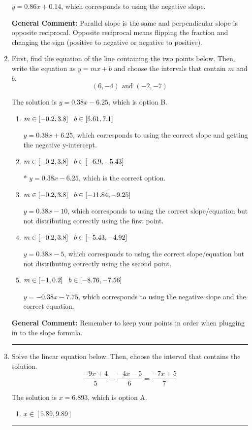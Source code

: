 \documentclass{extbook}[14pt]
\newcommand{\litem}[1]{\item #1

\rule{\textwidth}{0.4pt}}
\begin{document}
\begin{enumerate}
{\begin{enumerate}[label=\Alph*.]
 $y = 0.86x + 0.14$, which corresponds to using the negative slope.
\end{enumerate}

\textbf{General Comment:} Parallel slope is the same and perpendicular slope is opposite reciprocal. Opposite reciprocal means flipping the fraction and changing the sign (positive to negative or negative to positive).
}
\litem{
First, find the equation of the line containing the two points below. Then, write the equation as $ y=mx+b $ and choose the intervals that contain $m$ and $b$.
\[ (6, -4) \text{ and } (-2, -7) \]

The solution is \( y = 0.38x -6.25 \), which is option B.\begin{enumerate}[label=\Alph*.]
\item \( m \in [-0.2, 3.8] \hspace*{3mm} b \in [5.61, 7.1] \)

 $y = 0.38x + 6.25$, which corresponds to using the correct slope and getting the negative y-intercept.
\item \( m \in [-0.2, 3.8] \hspace*{3mm} b \in [-6.9, -5.43] \)

* $y = 0.38x -6.25$, which is the correct option.
\item \( m \in [-0.2, 3.8] \hspace*{3mm} b \in [-11.84, -9.25] \)

 $y = 0.38x -10$, which corresponds to using the correct slope/equation but not distributing correctly using the first point.
\item \( m \in [-0.2, 3.8] \hspace*{3mm} b \in [-5.43, -4.92] \)

 $y = 0.38x -5$, which corresponds to using the correct slope/equation but not distributing correctly using the second point.
\item \( m \in [-1, 0.2] \hspace*{3mm} b \in [-8.76, -7.56] \)

 $y = -0.38x -7.75$, which corresponds to using the negative slope and the correct equation.
\end{enumerate}

\textbf{General Comment:} Remember to keep your points in order when plugging in to the slope formula.
}
\litem{
Solve the linear equation below. Then, choose the interval that contains the solution.
\[ \frac{-9x + 4}{5} - \frac{-4x -5}{6} = \frac{-7x + 5}{7} \]

The solution is \( x = 6.893 \), which is option A.\begin{enumerate}[label=\Alph*.]
\item \( x \in [5.89, 9.89] \)


\end{enumerate}}
\end{enumerate}
\end{document}

